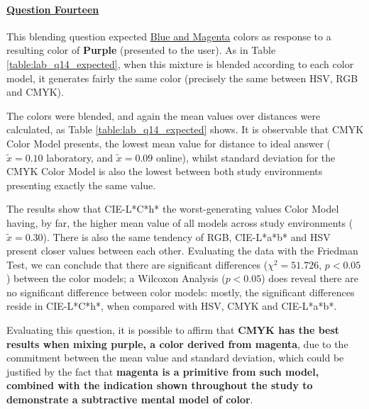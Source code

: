 \paragraph{\ul{Question Fourteen}}
%
This blending question expected \ul{Blue and Magenta} colors as response to a resulting color of \textbf{Purple} (presented to the user). As in Table \ref{table:lab_q14_expected},
when this mixture is blended according to each color model, it generates fairly the same color (precisely the same between HSV, RGB and CMYK). \par
%
The colors were blended, and again the mean values over distances were calculated, as Table \ref{table:lab_q14_expected} shows. It is observable that CMYK Color Model presents,
the lowest mean value for distance to ideal answer ($\tilde{x} = 0.10$ laboratory, and $\tilde{x} = 0.09$ online), whilst standard deviation for the CMYK Color Model is also the
lowest between both study environments presenting exactly the same value. \par
%
The results show that CIE-L*C*h* the worst-generating values Color Model having, by far, the higher mean value of all models across study environments ($\tilde{x} = 0.30$). There is also the same tendency of RGB,
CIE-L*a*b* and HSV present closer values between each other. Evaluating the data with the Friedman Test, we can conclude that there are significant differences ($\chi^2 = 51.726$, $p < 0.05$)
between the color models; a Wilcoxon Analysis ($p < 0.05$) does reveal there are no significant difference between color models: mostly, the significant differences reside in CIE-L*C*h*, when
compared with HSV, CMYK and CIE-L*a*b*. \par
%
Evaluating this question, it is possible to affirm that \textbf{CMYK has the best results when mixing purple, a color derived from magenta}, due to the commitment between the mean value and standard deviation, which
could be justified by the fact that \textbf{magenta is a primitive from such model, combined with the indication shown throughout the study to demonstrate a subtractive mental model of color}.
%
